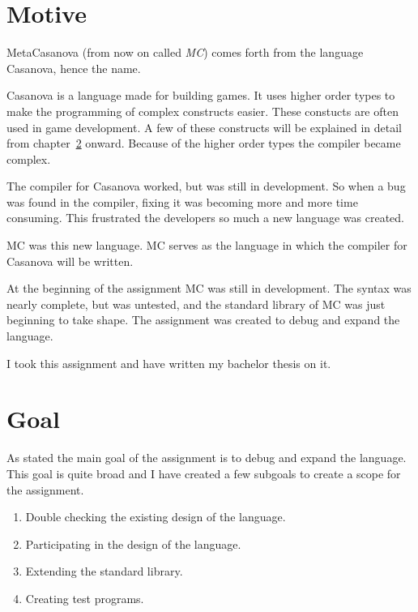 

\section{Motive}

MetaCasanova (from now on called \emph{MC}) comes forth from the language Casanova, hence the name.

Casanova is a language made for building games.
It uses higher order types to make the programming of complex constructs easier.
These constucts are often used in game development.
A few of these constructs will be explained in detail from chapter~\ref{} onward.
Because of the higher order types the compiler became complex.

The compiler for Casanova worked, but was still in development.
So when a bug was found in the compiler, fixing it was becoming more and more time consuming.
This frustrated the developers so much a new language was created.

MC was this new language.
MC serves as the language in which the compiler for Casanova will be written.

At the beginning of the assignment MC was still in development.
The syntax was nearly complete, but was untested, and the standard library of MC was just beginning to take shape.
The assignment was created to debug and expand the language.

I took this assignment and have written my bachelor thesis on it.

\section{Goal}
As stated the main goal of the assignment is to debug and expand the language.
This goal is quite broad and I have created a few subgoals to create a scope for the assignment.

\begin{enumerate}
   \item Double checking the existing design of the language.
   \item Participating in the design of the language.
   \item Extending the standard library.
   \item Creating test programs.
\end{enumerate}

